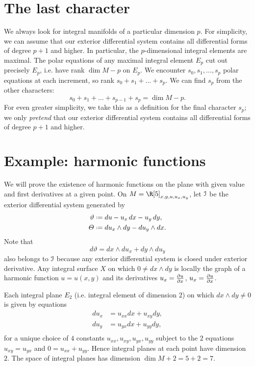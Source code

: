 \section{The last character}
We always look for integral manifolds of a particular dimension \(p\).
For simplicity, we can assume that our exterior differential system contains all differential forms of degree \(p+1\) and higher.
In particular, the \(p\)-dimensional integral elements are maximal.
The polar equations of any maximal integral element \(E_p\) cut out precisely \(E_p\), i.e. have rank \(\dim M - p\) on \(E_p\).
We encounter \(s_0, s_1,\dots,s_p\) polar equations at each increment, so rank \(s_0+s_1+\dots+s_p\).
We can find \(s_p\) from the other characters:
\[
s_0+s_1+\dots+s_{p-1}+s_p=\dim M - p.
\]
For even greater simplicity, we take this as a definition for the final character \(s_p\); we only \emph{pretend} that our exterior differential system contains all differential forms of degree \(p+1\) and higher.

\section{Example: harmonic functions}
We will prove the existence of harmonic functions on the plane with given value and first derivatives at a given point.
On \(M=\R[5]_{x,y,u,u_x,u_y}\), let \(\mathcal{I}\) be the exterior differential system generated by 
\begin{align*}
\vartheta & \defeq du-u_x \, dx - u_y \, dy, \\
\Theta &\defeq du_x \wedge dy - du_y \wedge dx.
\end{align*}
Note that
\[
d\vartheta = dx \wedge du_x+dy \wedge du_y
\]
also belongs to \(\mathcal{I}\) because any exterior differential system is closed under exterior derivative.
Any integral surface \(X\) on which \(0 \ne dx \wedge dy\) is locally the graph of a harmonic function \(u=u(x,y)\) and its derivatives \(u_x = \pderiv{u}{x}\), \(u_x = \pderiv{u}{x}\).

Each integral plane \(E_2\) (i.e. integral element of dimension \(2\)) on which \(dx \wedge dy \ne 0\) is given by equations
\begin{align*}
du_x &= u_{xx} dx + u_{xy} dy, \\
du_y &= u_{yx} dx + u_{yy} dy, \\
\end{align*}
for a unique choice of \(4\) constants \(u_{xx}, u_{xy}, u_{yx}, u_{yy}\)
subject to the \(2\) equations \(u_{xy}=u_{yx}\) and \(0=u_{xx}+u_{yy}\).
Hence integral planes at each point have dimension \(2\).
The space of integral planes has dimension \(\dim M + 2 = 5+2=7\).

